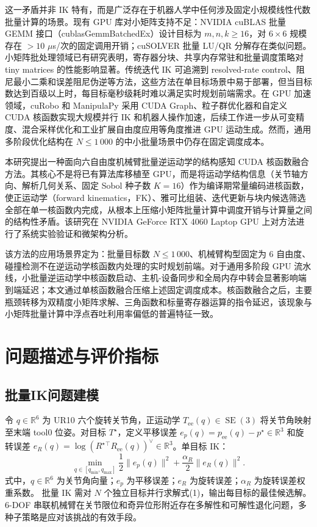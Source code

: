 \documentclass[twocolumn,a4paper,10pt]{ctexart}
\DeclareMathOperator{\SE}{SE}
\newcommand{\R}{\mathbb{R}}
\begin{document}
这一矛盾并非 IK 特有，而是广泛存在于机器人学中任何涉及固定小规模线性代数批量计算的场景。现有 GPU 库对小矩阵支持不足：NVIDIA cuBLAS 批量 GEMM 接口（cublasGemmBatchedEx）设计目标为 $m,n,k\ge16$，对 $6\times6$ 规模存在 $>10$ $\mu$s/次的固定调用开销；cuSOLVER 批量 LU/QR 分解存在类似问题\cite{cuda}。小矩阵批处理领域已有研究表明，寄存器分块、共享内存常驻和批量调度策略对 tiny matrices 的性能影响显著\cite{yang2025matrixfree}。传统迭代 IK 可追溯到 resolved-rate control、阻尼最小二乘和误差阻尼伪逆等方法\cite{domrachev2025mjinx,perrault2025kinopax,chen2024bodex}，这些方法在单目标场景中易于部署，但当目标数达到百级以上时，每目标毫秒级耗时难以满足实时规划前端需求。在 GPU 加速领域，cuRobo\cite{curobo} 和 ManipulaPy\cite{aboelnasr2025manipulapy} 采用 CUDA Graph、粒子群优化器和自定义 CUDA 核函数实现大规模并行 IK 和机器人操作加速，后续工作进一步从可变精度、混合采样优化和工业扩展自由度应用等角度推进 GPU 运动生成\cite{hsiao2023vapr,yasutake2025hjcdik,abuelsamen2025industrial}。然而，通用多阶段优化结构在 $N\le1\,000$ 的中小批量场景中仍存在固定调度成本。

本研究提出一种面向六自由度机械臂批量逆运动学的结构感知 CUDA 核函数融合方法。其核心不是将已有算法库移植至 GPU，而是将运动学结构信息（关节轴方向、解析几何关系、固定 Sobol 种子数 $K=16$）作为编译期常量编码进核函数，使正运动学（forward kinematics，FK）、雅可比组装、迭代更新与块内候选筛选全部在单一核函数内完成，从根本上压缩小矩阵批量计算中调度开销与计算量之间的结构性矛盾。该研究在 NVIDIA GeForce RTX 4060 Laptop GPU 上对方法进行了系统实验验证和微架构分析。

该方法的应用场景界定为：批量目标数 $N\le1\,000$、机械臂构型固定为 6 自由度、碰撞检测不在逆运动学核函数内处理的实时规划前端。对于通用多阶段 GPU 流水线，小批量逆运动学中核函数启动、主机-设备同步和全局内存中转会显著影响端到端延迟；本文通过单核函数融合压缩上述固定调度成本。核函数融合之后，主要瓶颈转移为双精度小矩阵求解、三角函数和标量寄存器运算的指令延迟，该现象与小矩阵批量计算中浮点吞吐利用率偏低的普遍特征一致。

\section{问题描述与评价指标}

\subsection{批量IK问题建模}

令 $q\in\R^6$ 为 UR10 六个旋转关节角，正运动学 $T_{\mathrm{ee}}(q)\in\SE(3)$ 将关节角映射至末端 tool0 位姿。对目标 $T^\star$，定义平移误差 $e_p(q)=p_{\mathrm{ee}}(q)-p^\star\in\R^3$ 和旋转误差 $e_R(q)=\log(R^\star{}^\top R_{\mathrm{ee}}(q))^\vee\in\R^3$。单目标 IK：
\begin{equation}
\min_{q\in[q_{\min},q_{\max}]}\frac{1}{2}\|e_p(q)\|^2+\frac{\alpha_R}{2}\|e_R(q)\|^2.
\end{equation}
式中，$q\in\R^6$ 为关节角向量；$e_p$ 为平移误差；$e_R$ 为旋转误差；$\alpha_R$ 为旋转误差权重系数。
批量 IK 需对 $N$ 个独立目标并行求解式(1)，输出每目标的最佳候选解。6-DOF 串联机械臂在关节限位和奇异位形附近存在多解性和可解性退化问题\cite{domrachev2025mjinx}，多种子策略是应对该挑战的有效手段。
\end{document}
